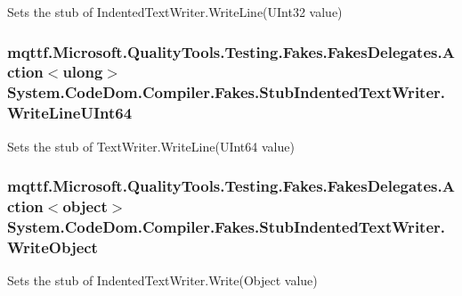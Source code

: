 Sets the stub of Indented\-Text\-Writer.\-Write\-Line(\-U\-Int32 value)

\hypertarget{class_system_1_1_code_dom_1_1_compiler_1_1_fakes_1_1_stub_indented_text_writer_ae40fb28c646affce0f273bd24cb970c1}{
\subsubsection[{Write\-Line\-U\-Int64}]{\setlength{\rightskip}{0pt plus 5cm}mqttf.\-Microsoft.\-Quality\-Tools.\-Testing.\-Fakes.\-Fakes\-Delegates.\-Action$<$ulong$>$ System.\-Code\-Dom.\-Compiler.\-Fakes.\-Stub\-Indented\-Text\-Writer.\-Write\-Line\-U\-Int64}}\label{class_system_1_1_code_dom_1_1_compiler_1_1_fakes_1_1_stub_indented_text_writer_ae40fb28c646affce0f273bd24cb970c1}


Sets the stub of Text\-Writer.\-Write\-Line(\-U\-Int64 value)

\hypertarget{class_system_1_1_code_dom_1_1_compiler_1_1_fakes_1_1_stub_indented_text_writer_af2784a724912b82c2463cffa159fcc19}{
\subsubsection[{Write\-Object}]{\setlength{\rightskip}{0pt plus 5cm}mqttf.\-Microsoft.\-Quality\-Tools.\-Testing.\-Fakes.\-Fakes\-Delegates.\-Action$<$object$>$ System.\-Code\-Dom.\-Compiler.\-Fakes.\-Stub\-Indented\-Text\-Writer.\-Write\-Object}}\label{class_system_1_1_code_dom_1_1_compiler_1_1_fakes_1_1_stub_indented_text_writer_af2784a724912b82c2463cffa159fcc19}


Sets the stub of Indented\-Text\-Writer.\-Write(\-Object value)

